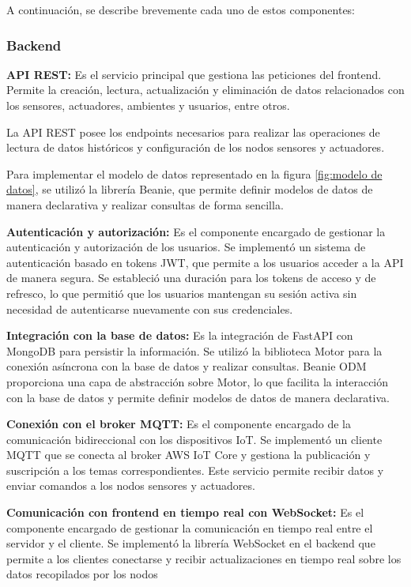 A continuación, se describe brevemente cada uno de estos componentes:

\subsubsection{Backend}


\textbf{API REST:} Es el servicio principal que gestiona las peticiones del frontend. Permite la
creación, lectura, actualización y eliminación de datos relacionados con los
sensores, actuadores, ambientes y usuarios, entre otros.

La API REST posee los endpoints necesarios para realizar las operaciones de
lectura de datos históricos y configuración de los nodos sensores y actuadores.

Para implementar el modelo de datos representado en la figura \ref{fig:modelo
    de datos}, se utilizó la librería Beanie, que permite definir modelos de datos
de manera declarativa y realizar consultas de forma sencilla.

\textbf{Autenticación y autorización:} Es el componente encargado de gestionar
la autenticación y autorización de los usuarios. Se implementó un sistema de
autenticación basado en tokens JWT, que permite a los usuarios acceder a la
API de manera segura. Se estableció una duración para los tokens de acceso y de
refresco, lo que permitió que los usuarios mantengan su sesión activa sin
necesidad de autenticarse nuevamente con sus credenciales.

\textbf{Integración con la base de datos:} Es la integración de FastAPI con MongoDB
para persistir la información. Se utilizó la biblioteca Motor para la conexión
asíncrona con la base de datos y realizar consultas. Beanie ODM proporciona una capa
de abstracción sobre Motor, lo que facilita la interacción con la base de datos y
permite definir modelos de datos de manera declarativa.

\textbf{Conexión con el broker MQTT:} Es el componente encargado de la comunicación
bidireccional con los
dispositivos IoT. Se implementó un cliente MQTT que se conecta al broker AWS
IoT Core y gestiona la publicación y suscripción a los temas correspondientes.
Este servicio permite recibir datos y enviar comandos a los nodos sensores y
actuadores.

\textbf{Comunicación con frontend en tiempo real con WebSocket:} Es el componente
encargado de gestionar la comunicación en tiempo real entre el servidor y el cliente.
Se implementó la librería WebSocket en el backend que permite a los clientes conectarse
y recibir actualizaciones en tiempo real sobre los datos recopilados por los nodos

